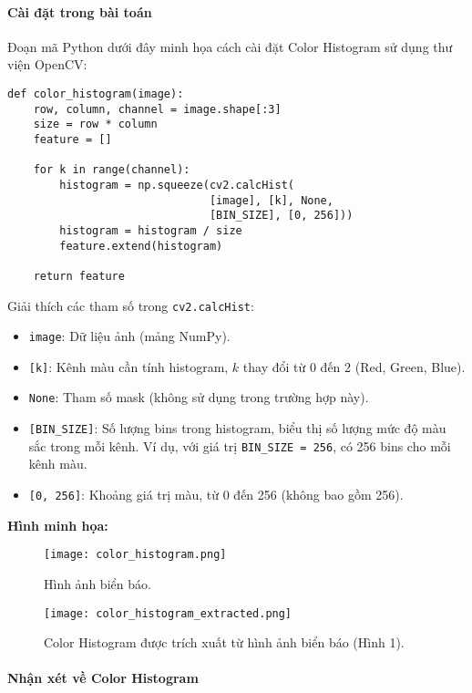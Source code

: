 \documentclass[a4paper,12pt]{article}
\begin{document}
\paragraph{Cài đặt trong bài toán}
\hspace{5mm}Đoạn mã Python dưới đây minh họa cách cài đặt Color Histogram sử dụng thư viện OpenCV:

\begin{verbatim}
def color_histogram(image):
    row, column, channel = image.shape[:3]
    size = row * column
    feature = []

    for k in range(channel):
        histogram = np.squeeze(cv2.calcHist(
                               [image], [k], None, 
                               [BIN_SIZE], [0, 256]))
        histogram = histogram / size
        feature.extend(histogram)

    return feature
\end{verbatim}

\noindent
Giải thích các tham số trong \texttt{cv2.calcHist}:
\begin{itemize}
    \item \texttt{image}: Dữ liệu ảnh (mảng NumPy).
    \item \texttt{[k]}: Kênh màu cần tính histogram, $k$ thay đổi từ 0 đến 2 (Red, Green, Blue).
    \item \texttt{None}: Tham số mask (không sử dụng trong trường hợp này).
    \item \texttt{[BIN\_SIZE]}: Số lượng bins trong histogram, biểu thị số lượng mức độ màu sắc trong mỗi kênh. Ví dụ, với giá trị \texttt{BIN\_SIZE = 256}, có 256 bins cho mỗi kênh màu.
    \item \texttt{[0, 256]}: Khoảng giá trị màu, từ 0 đến 256 (không bao gồm 256).
\end{itemize}

\vspace{0.5cm}

\noindent
\textbf{Hình minh họa:}
\begin{figure}[H]
    \centering
    \texttt{[image: color\_histogram.png]}
    \caption{Hình ảnh biển báo.}
    \vspace{0.5cm}
    \texttt{[image: color\_histogram\_extracted.png]}
    \caption{Color Histogram được trích xuất từ hình ảnh biển báo (Hình 1).}
    \label{fig:color_histogram}
\end{figure}

\paragraph{Nhận xét về Color Histogram}
\end{document}
